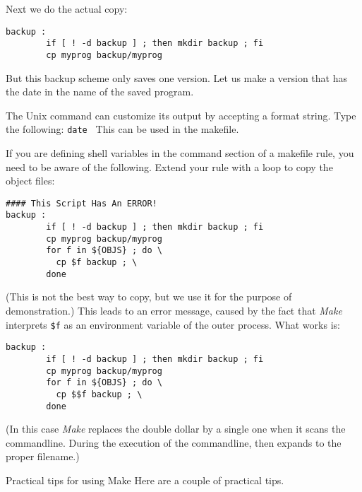 Next we do the actual copy:
\begin{lstlisting}
backup :
        if [ ! -d backup ] ; then mkdir backup ; fi
        cp myprog backup/myprog
\end{lstlisting}
But this backup scheme only saves one version. Let us make a version
that has the date in the name of the saved program. 

The Unix  command can customize its output by accepting a
format string. Type the following: 
%
\verb+date +%
%
This can be used in the makefile.


If you are defining shell variables in the command section of a
makefile rule, you need to be aware of the following. Extend your
 rule with a loop to copy the object files:
\begin{lstlisting}
#### This Script Has An ERROR!
backup :
        if [ ! -d backup ] ; then mkdir backup ; fi
        cp myprog backup/myprog
        for f in ${OBJS} ; do \
          cp $f backup ; \
        done
\end{lstlisting}
(This is not the best way to copy, but we use it for the purpose of
demonstration.) This leads to an error message, caused by the fact
that \emph{Make} interprets \verb+$f+ as an environment variable of
the outer process. What works is:
\begin{lstlisting}
backup :
        if [ ! -d backup ] ; then mkdir backup ; fi
        cp myprog backup/myprog
        for f in ${OBJS} ; do \
          cp $$f backup ; \
        done
\end{lstlisting}
(In this case \emph{Make} replaces the double dollar by a single one
when it scans the commandline. During the execution of the
commandline,  then expands to the proper filename.)

\Level 0 {Practical tips for using Make}
Here are a couple of practical tips.

